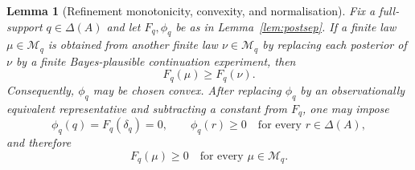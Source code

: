 \documentclass[11pt,a4paper]{article}
\newtheorem{lemma}[theorem]{Lemma}
\theoremstyle{definition}
\newcommand{\1}{\mathbf 1}
\begin{document}
\begin{lemma}[Refinement monotonicity, convexity, and normalisation]\label{lem:convnorm}
Fix a full-support $q\in\Delta(A)$ and let $F_q,\phi_q$ be as in Lemma~\ref{lem:postsep}.  If a finite law
$\mu\in\mathcal M_q$ is obtained from another finite law $\nu\in\mathcal M_q$ by replacing each posterior of $\nu$ by a
finite Bayes-plausible continuation experiment, then
\[
F_q(\mu)\ge F_q(\nu).
\]
Consequently, $\phi_q$ may be chosen convex.  After replacing $\phi_q$ by an observationally equivalent representative
and subtracting a constant from $F_q$, one may impose
\[
\phi_q(q)=F_q(\delta_q)=0,
\qquad
\phi_q(r)\ge 0\quad\text{for every }r\in\Delta(A),
\]
and therefore
\[
F_q(\mu)\ge 0\quad\text{for every }\mu\in\mathcal M_q.
\]
\end{lemma}
\end{document}
